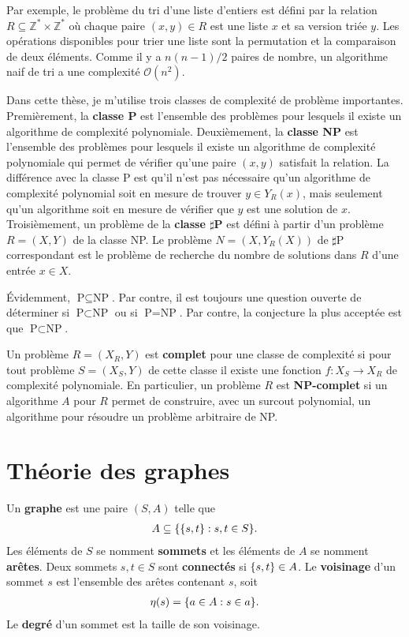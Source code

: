 Par exemple,
le problème du tri d'une liste d'entiers est défini par la relation
$R \subseteq \mathbb Z^* \times \mathbb Z^*$
où chaque paire $(x, y) \in R$ est une liste $x$ et sa version triée $y$.
Les opérations disponibles pour trier une liste sont la permutation et
la comparaison de deux éléments.
Comme il y a $n(n-1)/2$ paires de nombre,
un algorithme naif de tri a une complexité $\mathcal O(n^2)$.

Dans cette thèse,
je m'utilise trois classes de complexité de problème importantes.
Premièrement,
la \textbf{classe P} est l'ensemble des problèmes
pour lesquels il existe un algorithme de complexité polynomiale.
Deuxièmement,
la \textbf{classe NP} est l'ensemble des problèmes
pour lesquels il existe un algorithme de complexité polynomiale
qui permet de vérifier qu'une paire $(x, y)$ satisfait la relation.
La différence avec la classe P est qu'il n'est pas nécessaire qu'un 
algorithme de complexité polynomial soit en mesure de trouver $y \in Y_R(x)$,
mais seulement qu'un algorithme soit en mesure de vérifier que $y$ est une solution
de $x$.
Troisièmement,
un problème de la \textbf{classe $\sharp$P} est défini à partir d'un problème
$R = (X, Y)$ de la classe NP.
Le problème $N = (X, Y_R(X))$ de $\sharp$P correspondant est le problème de
recherche du nombre de solutions dans $R$ d'une entrée $x \in X$.

Évidemment, $\text{P} \subseteq \text{NP}$.
Par contre, 
il est toujours une question ouverte de déterminer si
$\text{P} \subset \text{NP}$ ou si $\text{P} = \text{NP}$.
Par contre,
la conjecture la plus acceptée est que $\text{P} \subset \text{NP}$.

Un problème $R = (X_R, Y)$ est \textbf{complet} pour une classe de complexité
si pour tout problème $S = (X_S, Y)$ de cette classe il existe une fonction 
$f: X_S \to X_R$ de complexité polynomiale.
En particulier,
un problème $R$ est \textbf{NP-complet} si un algorithme $A$ pour $R$
permet de construire, avec un surcout polynomial,
un algorithme pour résoudre un problème arbitraire de NP.



\chapter{Théorie des graphes}
\label{chap:theo_graphe}

Un \textbf{graphe} est une paire $(S, A)$ telle que 
\begin{align}
  A \subseteq \qty{\qty{s, t} : s,t \in S}.
\end{align}
Les éléments de $S$ se nomment \textbf{sommets}
et les éléments de $A$ se nomment \textbf{arêtes}.
Deux sommets $s, t \in S$ sont \textbf{connectés} si $\qty{s, t} \in A$.
Le \textbf{voisinage} d'un sommet $s$ est l'ensemble des arêtes contenant $s$,
soit 
\begin{align}
  \eta(s) = \qty{a \in A : s \in a}.
\end{align}
Le \textbf{degré} d'un sommet est la taille de son voisinage.

